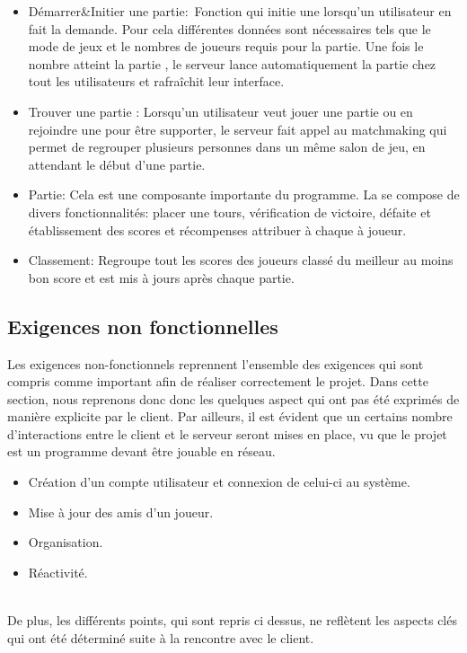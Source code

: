 \documentclass[10pt,a4paper]{article}
\begin{document}
\begin{itemize}
    \item Démarrer\&Initier une partie:\
    Fonction qui initie une  lorsqu'un \gls{utilisateur} en fait la demande. Pour cela différentes données sont nécessaires tels que le mode de jeux et le nombres de \glspl{joueur} requis pour la partie. Une fois le nombre atteint la partie , le serveur lance automatiquement la partie chez tout les \glspl{utilisateur} et rafraîchit leur interface.
    \item Trouver une partie \index{partie}: Lorsqu'un \gls{utilisateur} veut jouer une partie ou en rejoindre une pour être supporter, le serveur fait appel au matchmaking qui permet de regrouper plusieurs personnes dans un même salon de jeu, en attendant le début d'une partie. 
    \item Partie:
    Cela est une composante importante du programme. La  se compose de divers fonctionnalités: placer une tours, vérification de victoire, défaite et établissement des scores et récompenses attribuer à chaque à \gls{joueur}.
    \item Classement: Regroupe tout les scores des joueurs classé du meilleur au moins bon score et est mis à jours après chaque partie.
\end{itemize}

\subsection{Exigences non fonctionnelles}
Les exigences non-fonctionnels reprennent l’ensemble des exigences qui sont compris comme important afin de réaliser correctement
le projet. Dans cette section, nous reprenons donc donc les quelques aspect qui ont pas été
exprimés de manière explicite par le client.
Par ailleurs, il est évident que un certains nombre d’interactions entre le \gls{client} et le \gls{serveur} seront mises en place, vu que le projet est un programme devant être jouable en réseau.\\


\begin{itemize}
    \item Création d'un \gls{compte} \gls{utilisateur} et connexion de celui-ci au système.
    \item Mise à jour des amis d'un joueur. 
    \item Organisation.
    \item Réactivité.
\end{itemize}
\\
De plus, les différents points, qui sont repris ci dessus, ne reflètent les aspects clés qui ont été déterminé suite à la rencontre avec le client.\\
\end{document}
